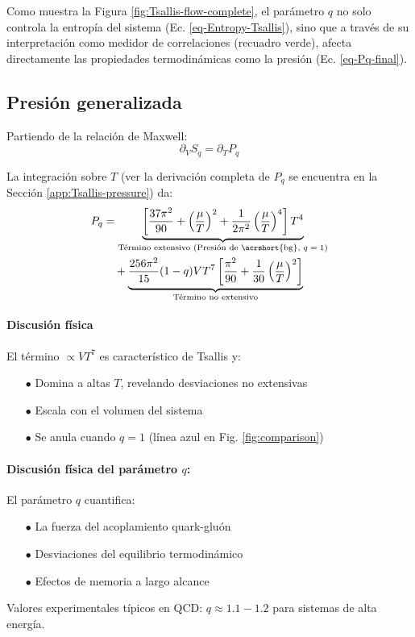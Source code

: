 Como muestra la Figura \ref{fig:Tsallis-flow-complete}, el parámetro $q$ no solo controla la entropía del sistema (Ec. \ref{eq-Entropy-Tsallis}), sino que a través de su interpretación como medidor de correlaciones (recuadro verde), afecta directamente las propiedades termodinámicas como la presión (Ec. \ref{eq-Pq-final}).

\subsection{Presión generalizada}

Partiendo de la relación de Maxwell:
\begin{equation}\label{eq-Max-rel-S-P}
\partial_V {S}_q = \partial_T {P}_q
\end{equation}

La integración sobre $T$ (ver la derivación completa de $P_q$ se encuentra en la Sección \ref{app:Tsallis-pressure}) da:
\begin{align}\label{eq-Pq-final}
{P}_q &= \underbrace{\left[\frac{37\pi^2}{90} + \left(\frac{\mu}{T}\right)^2 + \frac{1}{2\pi^2}\left(\frac{\mu}{T}\right)^4\right]T^4}_{\text{Término extensivo (Presión de \acrshort{bg}, $q=1$)}} \nonumber \\
&\quad + \underbrace{\frac{256\pi^2}{15}(1-q)V T^7 \left[\frac{{\pi}^{2}}{90} + \frac{1}{30} \left(\frac{\mu}{T} \right)^{2} \right]}_{\text{Término no extensivo}}
\end{align}

\paragraph{Discusión física}  
El término $\propto V T^7$ es característico de Tsallis y:
\begin{itemize}
    \item[$\bullet$] Domina a altas $T$, revelando desviaciones no extensivas
    \item[$\bullet$] Escala con el volumen del sistema
    \item[$\bullet$] Se anula cuando $q=1$ (línea azul en Fig. \ref{fig:comparison})
\end{itemize}

\paragraph{Discusión física del parámetro $q$:}
El parámetro $q$ cuantifica:
\begin{itemize}
    \item[$\bullet$] La fuerza del acoplamiento quark-gluón
    \item[$\bullet$] Desviaciones del equilibrio termodinámico
    \item[$\bullet$] Efectos de memoria a largo alcance
    
\end{itemize}
Valores experimentales típicos en QCD: $q \approx 1.1 - 1.2$ para sistemas de alta energía.%

